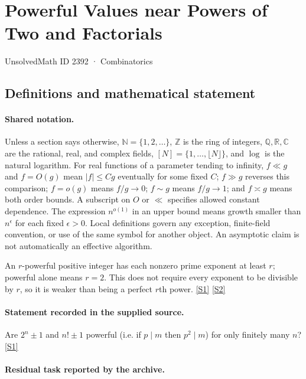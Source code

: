 \documentclass[11pt,a4paper]{article}
\newcommand{\N}{\mathbb{N}}
\newcommand{\Z}{\mathbb{Z}}
\newcommand{\Q}{\mathbb{Q}}
\newcommand{\R}{\mathbb{R}}
\newcommand{\C}{\mathbb{C}}
\newcommand{\sref}[2]{\hyperlink{source:#1:#2}{[S#2]}}
\begin{document}

\setcounter{section}{2391}

\section{Powerful Values near Powers of Two and Factorials}\label{2392}

{\small\sffamily UnsolvedMath ID 2392 · Combinatorics}

\subsection{Definitions and mathematical statement}

\paragraph{Shared notation.}Unless a section says otherwise, $\N=\{1,2,\ldots\}$,
$\Z$ is the ring of integers, $\Q,\R,\C$ are the rational, real, and complex
fields, $[N]=\{1,\ldots,\lfloor N\rfloor\}$, and $\log$ is the natural
logarithm. For real functions of a parameter tending to infinity,
$f\ll g$ and $f=O(g)$ mean $|f|\leq Cg$ eventually for some fixed $C$;
$f\gg g$ reverses this comparison; $f=o(g)$ means $f/g\to0$;
$f\sim g$ means $f/g\to1$; and $f\asymp g$ means both order bounds.
A subscript on $O$ or $\ll$ specifies allowed constant dependence.
The expression $n^{o(1)}$ in an upper bound means growth smaller than
$n^\epsilon$ for each fixed $\epsilon>0$. Local definitions govern any
exception, finite-field convention, or use of the same symbol for another
object. An asymptotic claim is not automatically an effective algorithm.



An $r$-powerful positive integer has each nonzero prime exponent at least $r$; powerful alone means $r=2$. This does not require every exponent to be divisible by $r$, so it is weaker than being a perfect $r$th power. \sref{2392}{1} \sref{2392}{2}

\paragraph{Statement recorded in the supplied source.}
Are $ 2^n\pm 1 $ and $ n!\pm 1 $ powerful (i.e. if $p\mid m$ then $p^2\mid m$) for only finitely many $n$? \sref{2392}{1}

\paragraph{Residual task reported by the archive.}
\end{document}
